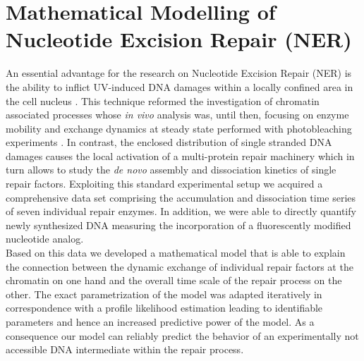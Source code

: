 \chapter{Mathematical Modelling of Nucleotide Excision Repair (NER)}
\pagestyle{plain}
%
An essential advantage for the research on Nucleotide Excision Repair (NER) is the ability to inflict UV-induced DNA damages within a locally confined area in the cell nucleus \cite{Mone2001}. This technique reformed the investigation of chromatin associated processes whose \textit{in vivo} analysis was, until then, focusing on enzyme mobility and exchange dynamics at steady state performed with photobleaching experiments \cite{Houtsmuller2001,Mone2004}. In contrast, the enclosed distribution of single stranded DNA damages causes the local activation of a multi-protein repair machinery which in turn allows to study the \textit{de novo} assembly and dissociation kinetics of single repair factors. Exploiting this standard experimental setup we acquired a comprehensive data set comprising the accumulation and dissociation time series of seven individual repair enzymes. In addition, we were able to directly quantify newly synthesized DNA measuring the incorporation of a fluorescently modified nucleotide analog.\\
Based on this data we developed a mathematical model that is able to explain the connection between the dynamic exchange of individual repair factors at the chromatin on one hand and the overall time scale of the repair process on the other. The exact parametrization of the model was adapted iteratively in correspondence with a profile likelihood estimation leading to identifiable parameters and hence an increased predictive power of the model. As a consequence our model can reliably predict the behavior of an experimentally not accessible DNA intermediate within the repair process.\\
   


